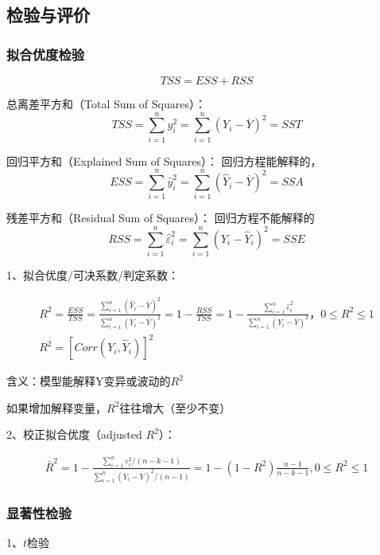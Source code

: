 \documentclass[12pt]{book}
\begin{document}
\subsection{检验与评价}

\subsubsection{拟合优度检验}

$$
TSS=ESS+RSS
$$

\par 总离差平方和（Total Sum of Squares）：  
$$ TSS=\sum_{i=1}^{n}y_i^2=\sum_{i=1}^{n}\left(Y_i-\overline{Y}\right)^2=SST $$  
\par 回归平方和（Explained Sum of Squares）： 回归方程能解释的，  
$$ ESS=\sum_{i=1}^{n}{\hat{y}}_i^2=\sum_{i=1}^{n}\left({\hat{Y}}_i-\overline{Y}\right)^2=SSA $$
\par 残差平方和（Residual Sum of Squares）： 回归方程不能解释的  
$$ RSS=\sum_{i=1}^{n}{\hat{\varepsilon}}_i^2=\sum_{i=1}^{n}\left(Y_i-{\hat{Y}}_i\right)^2=SSE $$


1、拟合优度/可决系数/判定系数：

\begin{gather*}
R^2=\frac{ESS}{TSS} 
=\frac{\sum_{i=1}^{n}\left({\hat{Y}}_i-\overline{Y}\right)^2}{\sum_{i=1}^{n}\left(Y_i-\overline{Y}\right)^2} 
=1-\frac{RSS}{TSS}
=1-\frac{\sum_{i=1}^{n}{\hat{\varepsilon}}_i^2}{\sum_{i=1}^{n}\left(Y_i-\overline{Y}\right)^2}，0\leqslant R^2\leqslant 1 \\ 
R^2=\left[Corr\left(Y_i,{\hat{Y}}_i\right)\right]^2
\end{gather*}


\par 含义：模型能解释Y变异或波动的$R^2$  
\par 如果增加解释变量，$R^2$往往增大（至少不变）

2、校正拟合优度（adjusted $R^2$）：

\begin{gather*}
    {\bar{R}}^2 
=1-\frac{\sum_{i=1}^{n}{\varepsilon_i^2/(n-k-1)}}{\sum_{i=1}^{n}{(Y_i-\bar{Y})^2}/(n-1)} 
=1-(1-R^2)\frac{n-1}{n-k-1}, 0\leqslant R^2\leqslant 1
\end{gather*}


\subsubsection{显著性检验}

1、$t$检验
\end{document}
